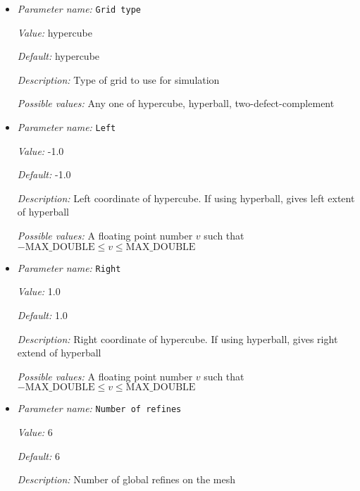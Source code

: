 \begin{itemize}
\item {\it Parameter name:} {\tt Grid type}
\label{parameters:NematicSystemMPIDriver/Grid/Grid type}
\label{parameters:NematicSystemMPIDriver/Grid/Grid_20type}


{\it Value:} hypercube


{\it Default:} hypercube


{\it Description:} Type of grid to use for simulation


{\it Possible values:} Any one of hypercube, hyperball, two-defect-complement
\item {\it Parameter name:} {\tt Left}
\label{parameters:NematicSystemMPIDriver/Grid/Left}


{\it Value:} -1.0


{\it Default:} -1.0


{\it Description:} Left coordinate of hypercube. If using hyperball, gives left extent of hyperball


{\it Possible values:} A floating point number $v$ such that $-\text{MAX\_DOUBLE} \leq v \leq \text{MAX\_DOUBLE}$
\item {\it Parameter name:} {\tt Right}
\label{parameters:NematicSystemMPIDriver/Grid/Right}


{\it Value:} 1.0


{\it Default:} 1.0


{\it Description:} Right coordinate of hypercube. If using hyperball, gives right extend of hyperball


{\it Possible values:} A floating point number $v$ such that $-\text{MAX\_DOUBLE} \leq v \leq \text{MAX\_DOUBLE}$
\item {\it Parameter name:} {\tt Number of refines}
\label{parameters:NematicSystemMPIDriver/Grid/Number of refines}
\label{parameters:NematicSystemMPIDriver/Grid/Number_20of_20refines}


{\it Value:} 6


{\it Default:} 6


{\it Description:} Number of global refines on the mesh



\end{itemize}
